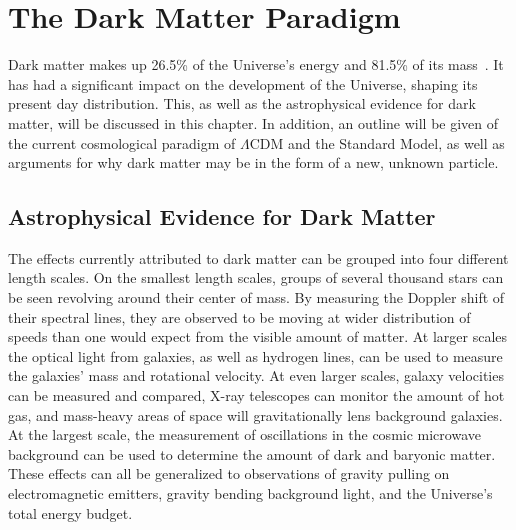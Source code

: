 \cleartooddpage[\thispagestyle{empty}]
\newcommand{\thetamc}{\theta_{\textrm{MC}}}
\newcommand{\mlratio}{$\left [ \frac{\textrm{M}_\odot}{\textrm{L}_\odot} \right ]$}
\chapter{The Dark Matter Paradigm}\label{ch_dm}

Dark matter makes up 26.5\% of the Universe's energy and 81.5\% of its mass~\cite{planck2015}.
It has had a significant impact on the development of the Universe, shaping its present day distribution.
This, as well as the astrophysical evidence for dark matter, will be discussed in this chapter.
In addition, an outline will be given of the current cosmological paradigm of $\Lambda$CDM and the Standard Model, as well as arguments for why dark matter may be in the form of a new, unknown particle.



\section{Astrophysical Evidence for Dark Matter}
  
The effects currently attributed to dark matter can be grouped into four different length scales.
On the smallest length scales, groups of several thousand stars can be seen revolving around their center of mass.
By measuring the Doppler shift of their spectral lines, they are observed to be moving at wider distribution of speeds than one would expect from the visible amount of matter.
At larger scales the optical light from galaxies, as well as hydrogen lines, can be used to measure the galaxies' mass and rotational velocity.
At even larger scales, galaxy velocities can be measured and compared, X-ray telescopes can monitor the amount of hot gas, and mass-heavy areas of space will gravitationally lens background galaxies.
At the largest scale, the measurement of oscillations in the cosmic microwave background can be used to determine the amount of dark and baryonic matter.
These effects can all be generalized to observations of gravity pulling on electromagnetic emitters, gravity bending background light, and the Universe's total energy budget.

